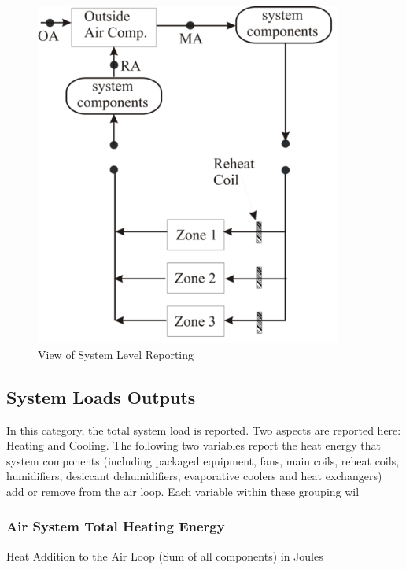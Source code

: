 \begin{figure}[hbtp] %
\centering
\includegraphics[width=0.9\textwidth, height=0.9\textheight, keepaspectratio=true]{media/image213.png}
\caption{View of System Level Reporting \protect \label{fig:view-of-system-level-reporting}}
\end{figure}

\subsection{System Loads Outputs}\label{system-loads-outputs}

In this category, the total system load is reported. Two aspects are reported here: Heating and Cooling. The following two variables report the heat energy that system components (including packaged equipment, fans, main coils, reheat coils, humidifiers, desiccant dehumidifiers, evaporative coolers and heat exchangers) add or remove from the air loop. Each variable within these grouping wil

\subsubsection{Air System Total Heating Energy}\label{air-system-total-heating-energy}

Heat Addition to the Air Loop (Sum of all components) in Joules

